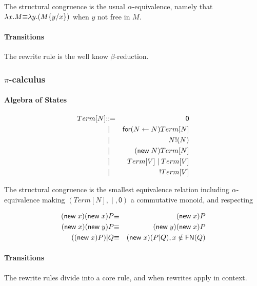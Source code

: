 The structural congruence is the usual $\alpha$-equivalence, namely that $\lambda x.M \scong \lambda y.(M\{y / x\})$ when $y$ not free in $M$.

\paragraph{Transitions}
The rewrite rule is the well know $\beta$-reduction.
\begin{mathpar}
\end{mathpar}

\subsubsection{$\pi$-calculus}

\paragraph{Algebra of States}
\begin{eqnarray*}
  Term[N] & \bc & \mathsf{0} \\
  & \;\bm\; & \mathsf{for}\mathsf{(}N \leftarrow N\mathsf{)}Term[N] \\
  & \;\bm\; & N\mathsf{!}\mathsf{(}N\mathsf{)} \\
  & \;\bm\; & \mathsf{(}\mathsf{new}\; N\mathsf{)}Term[N] \\
  & \;\bm\; & Term[V] \; \mathsf{|}\; Term[V] \\
  & \;\bm\; & \mathsf{!}Term[V]
\end{eqnarray*}

The structural congruence is the smallest equivalence relation including $\alpha$-equivalence making $(Term[N],\;\mathsf{|}\;,\mathsf{0})$ a commutative monoid, and respecting

\begin{eqnarray*}
  \mathsf{(}\mathsf{new}\; x\mathsf{)}\mathsf{(}\mathsf{new}\; x\mathsf{)}P & \scong & \mathsf{(}\mathsf{new}\; x\mathsf{)}P \\
  \mathsf{(}\mathsf{new}\; x\mathsf{)}\mathsf{(}\mathsf{new}\; y\mathsf{)}P & \scong & \mathsf{(}\mathsf{new}\; y\mathsf{)}\mathsf{(}\mathsf{new}\; x\mathsf{)}P \\
  (\mathsf{(}\mathsf{new}\; x\mathsf{)}P)\mathsf{|}Q & \scong & \mathsf{(}\mathsf{new}\; x\mathsf{)}(P\mathsf{|}Q), x \notin \freenames{Q}
\end{eqnarray*}  

\paragraph{Transitions}
The rewrite rules divide into a core rule, and when rewrites apply in
context.

